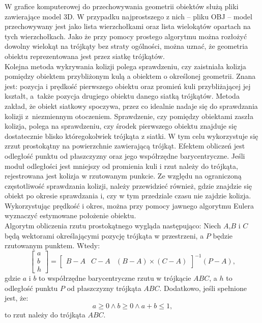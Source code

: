 W grafice komputerowej do przechowywania geometrii obiektów służą pliki zawierające model 3D. W przypadku najprostszego z nich -- pliku OBJ -- model przechowywany jest jako lista wierzchołkami oraz lista wielokątów opartach na tych wierzchołkach. Jako że przy pomocy prostego algorytmu można rozłożyć dowolny wielokąt na trójkąty bez straty ogólności, można uznać, że geometria obiektu reprezentowana jest przez siatkę trójkątów.\\

Kolejna metoda wykrywania kolizji polega sprawdzeniu, czy zaistniała kolizja pomiędzy obiektem przybliżonym kulą a obiektem o określonej geometrii. Znana jest: pozycja i prędkość pierwszego obiektu oraz promień kuli przybliżającej jej kształt, a~także pozycja drugiego obiektu danego siatką trójkątów. Metoda zakład, że obiekt siatkowy spoczywa, przez co idealnie nadaje się do sprawdzania kolizji z~niezmiennym otoczeniem. Sprawdzenie, czy pomiędzy obiektami zaszła kolizja, polega na sprawdzeniu, czy środek pierwszego obiektu znajduje się dostatecznie blisko któregokolwiek trójkąta z siatki. W tym celu wykorzystuje się zrzut prostokątny na powierzchnie zawierającą trójkąt. Efektem obliczeń jest odległość punktu od płaszczyzny oraz jego współrzędne barycentryczne. Jeśli moduł odległości jest mniejszy od promienia kuli i rzut należy do trójkąta, rejestrowana jest kolizja w rzutowanym punkcie. Ze względu na ograniczoną częstotliwość sprawdzania kolizji, należy przewidzieć również, gdzie znajdzie się obiekt po okresie sprawdzania i, czy w tym przedziale czasu nie zajdzie kolizja. Wykorzystując prędkość i okres, można przy pomocy jawnego algorytmu Eulera wyznaczyć estymowane położenie obiektu.\\

Algorytm obliczenia rzutu prostokątnego wygląda następująco: Niech $A$,$B$ i $C$ będą wektorami określającymi pozycję trójkąta w przestrzeni, a $P$ będzie rzutowanym punktem. Wtedy:
\[
	\begin{bmatrix}
	a \\ b \\ h
	\end{bmatrix}
	=
	\begin{bmatrix}
	B - A & C - A & (B - A) \times (C - A)
	\end{bmatrix}^{-1} \left( P - A \right),
\]
gdzie $a$ i $b$ to współrzędne barycentryczne rzutu w trójkącie $ABC$, a $h$ to odległość punktu $P$ od płaszczyzny trójkąta $ABC$. Dodatkowo, jeśli spełnione jest, że:
\[
a \geq 0 \land b \geq 0 \land a + b \leq 1,
\]
to rzut należy do trójkąta $ABC$.\\

